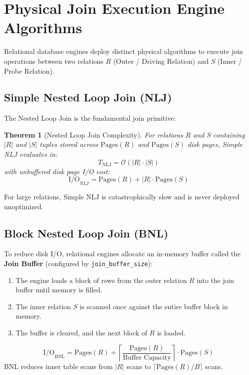 \documentclass[10pt,twocolumn,letterpaper]{article}
\newtheorem{theorem}{Theorem}
\begin{document}
\section{Physical Join Execution Engine Algorithms}
\label{sec:join_algorithms}

Relational database engines deploy distinct physical algorithms to execute join operations between two relations $R$ (Outer / Driving Relation) and $S$ (Inner / Probe Relation).

\subsection{Simple Nested Loop Join (NLJ)}
The Nested Loop Join is the fundamental join primitive:
\begin{theorem}[Nested Loop Join Complexity]
For relations $R$ and $S$ containing $|R|$ and $|S|$ tuples stored across $\text{Pages}(R)$ and $\text{Pages}(S)$ disk pages, Simple NLJ evaluates in:
\begin{equation}
T_{\text{NLJ}} = \mathcal{O}(|R| \cdot |S|)
\end{equation}
with unbuffered disk page I/O cost:
\begin{equation}
\text{I/O}_{\text{NLJ}} = \text{Pages}(R) + |R| \cdot \text{Pages}(S)
\end{equation}
\end{theorem}
For large relations, Simple NLJ is catastrophically slow and is never deployed unoptimized.

\subsection{Block Nested Loop Join (BNL)}
To reduce disk I/O, relational engines allocate an in-memory buffer called the \textbf{Join Buffer} (configured by \texttt{join\_buffer\_size}):
\begin{enumerate}
    \item The engine loads a block of rows from the outer relation $R$ into the join buffer until memory is filled.
    \item The inner relation $S$ is scanned once against the entire buffer block in memory.
    \item The buffer is cleared, and the next block of $R$ is loaded.
\end{enumerate}
\begin{equation}
\text{I/O}_{\text{BNL}} = \text{Pages}(R) + \left\lceil \frac{\text{Pages}(R)}{\text{Buffer Capacity}} \right\rceil \cdot \text{Pages}(S)
\end{equation}
BNL reduces inner table scans from $|R|$ scans to $\lceil \text{Pages}(R) / B \rceil$ scans.
\end{document}

